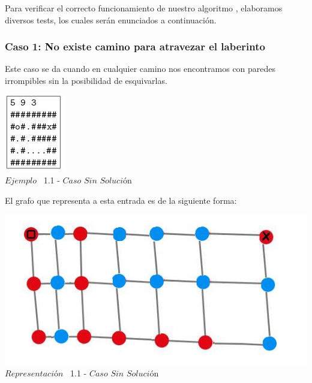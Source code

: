 \indent Para verificar el correcto funcionamiento de nuestro algoritmo , elaboramos diversos tests,
los cuales ser\'an enunciados a continuaci\'on.\\

\begin{center}
 \subsubsection*{Caso 1: No existe camino para atravezar el laberinto}
\end{center}

Este caso se da cuando en cualquier camino nos encontramos con paredes irrompibles sin la posibilidad de esquivarlas.\\
 
\vspace*{0.3cm} \vspace*{0.3cm}
  \begin{center}
 \includegraphics[scale=1.60]{./EJ1/ej1sinsolucion.jpeg}
\\{$Ejemplo$ \ 1.1 - $Caso$ $Sin$ $Soluci$\'on}
  \end{center}
  \vspace*{0.3cm}

El grafo que representa a esta entrada es de la siguiente forma:\\

\vspace*{0.3cm} \vspace*{0.3cm}
  \begin{center}
 \includegraphics[scale=0.5]{./EJ1/ej1grafosinsolucion.jpeg}
 \\{$Representación$ \ 1.1 - $Caso$ $Sin$ $Soluci$\'on}
  \end{center}
  \vspace*{0.3cm}


